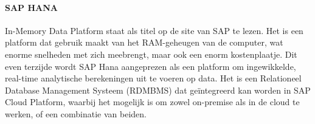     \paragraph{SAP HANA}
    In-Memory Data Platform staat als titel op de site van SAP te lezen. Het is een platform dat gebruik maakt van het RAM-geheugen van de computer, wat enorme snelheden met zich meebrengt, maar ook een enorm kostenplaatje. Dit even terzijde wordt SAP Hana aangeprezen als een platform om ingewikkelde, real-time analytische berekeningen uit te voeren op data.
    Het is een Relationeel Database Management Systeem (RDMBMS) dat geïntegreerd kan worden in SAP Cloud Platform, waarbij het mogelijk is om zowel on-premise als in de cloud te werken, of een combinatie van beiden.
